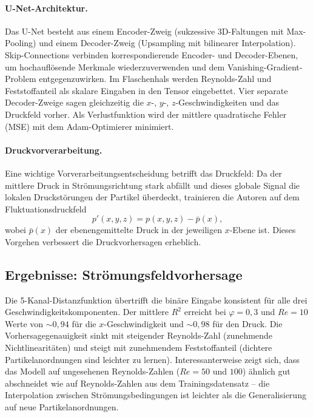 \documentclass[a4paper,12pt]{article}
\begin{document}
\paragraph{U-Net-Architektur.}
Das U-Net besteht aus einem Encoder-Zweig (sukzessive 3D-Faltungen mit
Max-Pooling) und einem Decoder-Zweig (Upsampling mit bilinearer Interpolation).
Skip-Connections verbinden korrespondierende Encoder- und Decoder-Ebenen, um
hochauflösende Merkmale wiederzuverwenden und dem Vanishing-Gradient-Problem
entgegenzuwirken. Im Flaschenhals werden Reynolds-Zahl und Feststoffanteil als
skalare Eingaben in den Tensor eingebettet. Vier separate Decoder-Zweige
sagen gleichzeitig die $x$-, $y$-, $z$-Geschwindigkeiten und das Druckfeld
vorher. Als Verlustfunktion wird der mittlere quadratische Fehler (MSE) mit
dem Adam-Optimierer minimiert.

\paragraph{Druckvorverarbeitung.}
Eine wichtige Vorverarbeitungsentscheidung betrifft das Druckfeld: Da der
mittlere Druck in Strömungsrichtung stark abfällt und dieses globale Signal
die lokalen Druckstörungen der Partikel überdeckt, trainieren die Autoren auf
dem Fluktuationsdruckfeld
\begin{equation}
    p'(x,y,z) = p(x,y,z) - \bar{p}(x),
\end{equation}
wobei $\bar{p}(x)$ der ebenengemittelte Druck in der jeweiligen $x$-Ebene ist.
Dieses Vorgehen verbessert die Druckvorhersagen erheblich.

\subsection*{Ergebnisse: Strömungsfeldvorhersage}

Die 5-Kanal-Distanzfunktion übertrifft die binäre Eingabe konsistent für alle
drei Geschwindigkeitskomponenten. Der mittlere $R^2$ erreicht bei
$\varphi = 0{,}3$ und $Re = 10$ Werte von $\sim\!0{,}94$ für die
$x$-Geschwindigkeit und $\sim\!0{,}98$ für den Druck. Die Vorhersagegenauigkeit
sinkt mit steigender Reynolds-Zahl (zunehmende Nichtlinearitäten) und steigt
mit zunehmendem Feststoffanteil (dichtere Partikelanordnungen sind leichter zu
lernen). Interessanterweise zeigt sich, dass das Modell auf ungesehenen
Reynolds-Zahlen ($Re = 50$ und $100$) ähnlich gut abschneidet wie auf
Reynolds-Zahlen aus dem Trainingsdatensatz -- die Interpolation zwischen
Strömungsbedingungen ist leichter als die Generalisierung auf neue
Partikelanordnungen.
\end{document}
